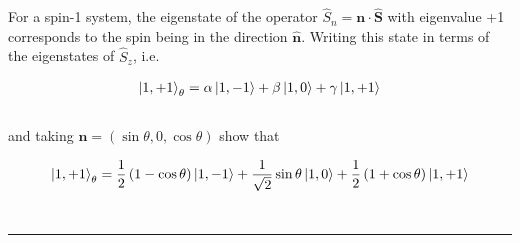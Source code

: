 
\begin{problem}{6.6}
    For a spin-1 system, the eigenstate of the operator $\hat{S}_n = \mathbf{n}\cdot\hat{\mathbf{S}}$ with eigenvalue +1 
    corresponds to the spin being in the direction $\hat{\mathbf{n}}$. Writing this state in terms of the eigenstates of $\hat{S}_z$, i.e.

    \begin{align*}
        \ket{1,+1}_\theta = \alpha \ket{1,-1} + \beta \ket{1,0} + \gamma \ket{1,+1}
    \end{align*}\\
    and taking $\mathbf{n} = \left(\sin\theta,0,\cos\theta\right)$ show that

    \begin{align*}
        \ket{1,+1}_\theta = \frac{1}{2}\left(1-\cos\theta\right)\ket{1,-1} + \frac{1}{\sqrt{2}} \sin\theta \ket{1,0} + \frac{1}{2}\left(1+\cos\theta\right) \ket{1,+1}
    \end{align*}\\

\end{problem}
\begin{solution}

\end{solution}

\noindent\rule{7in}{1.5pt}


